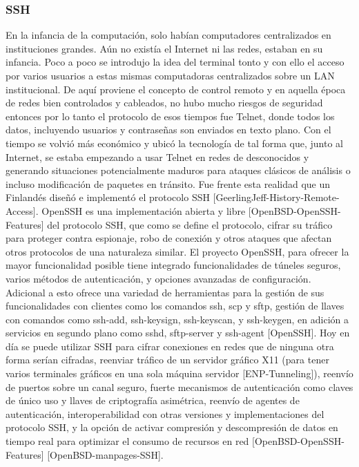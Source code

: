 \subsubsection{SSH}
En la infancia de la computación, solo habían computadores centralizados en instituciones grandes. Aún no existía el Internet ni las  redes, estaban en su infancia. Poco a poco se introdujo la idea del terminal tonto y con ello el acceso por varios usuarios a estas mismas computadoras centralizados sobre un LAN institucional. De aquí proviene el concepto de control remoto y en aquella época de redes bien controlados y cableados, no hubo mucho riesgos de seguridad entonces por lo tanto el protocolo de esos tiempos fue Telnet, donde todos los datos, incluyendo usuarios y contraseñas son enviados en texto plano. Con el tiempo se volvió más económico y ubicó la tecnología de tal forma que, junto al Internet, se estaba empezando a usar Telnet en redes de desconocidos y generando situaciones potencialmente maduros para ataques clásicos de análisis o incluso modificación de paquetes en tránsito. Fue frente esta realidad que un Finlandés diseñó e implementó el protocolo SSH [GeerlingJeff-History-Remote-Access]. OpenSSH es una implementación abierta y libre [OpenBSD-OpenSSH-Features] del protocolo SSH, que como se define el protocolo, cifrar su tráfico para proteger contra espionaje, robo de conexión y otros ataques que afectan otros protocolos de una naturaleza similar. El proyecto OpenSSH, para ofrecer la mayor funcionalidad posible tiene integrado funcionalidades de túneles seguros, varios métodos de autenticación, y opciones avanzadas de configuración. Adicional a esto ofrece una variedad de herramientas para la gestión de sus funcionalidades con clientes como los comandos ssh, scp y sftp, gestión de llaves con comandos como ssh-add, ssh-keysign, ssh-keyscan, y ssh-keygen, en adición a servicios en segundo plano como sshd, sftp-server y ssh-agent [OpenSSH]. Hoy en día se puede utilizar SSH para cifrar conexiones en redes que de ninguna otra forma serían cifradas, reenviar tráfico de un servidor gráfico X11 (para tener varios terminales gráficos en una sola máquina servidor [ENP-Tunneling]), reenvío de puertos sobre un canal seguro, fuerte mecanismos de autenticación como claves de único uso y llaves de criptografía asimétrica, reenvío de agentes de autenticación, interoperabilidad con otras versiones y implementaciones del protocolo SSH, y la opción de activar compresión y descompresión de datos en tiempo real para optimizar el consumo de recursos en red [OpenBSD-OpenSSH-Features] [OpenBSD-manpages-SSH].


